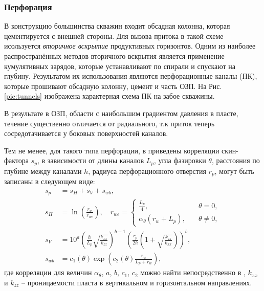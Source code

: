 \subsubsection{Перфорация}
	В конструкцию большинства скважин входит обсадная колонна, которая цементируется с внешней стороны.  Для вызова притока в такой схеме исользуется \textit{вторичное вскрытие} продуктивных горизонтов. Одним из наиболее распространённых методов вторичного вскрытия является применение кумулятивных зарядов, которые устанавливают по спирали и спускают на глубину.
Результатом их использования являются перфорационные каналы (ПК), которые прошивают обсадную колонну, цемент и часть ОЗП. На Рис. \ref{pic:tunnels} изображена характерная схема ПК на забое скважины.

	В результате в ОЗП, области с наибольшим градиентом давления в пласте, течение существенно отличается от радиального, т.к приток теперь сосредотачивается у боковых поверхностей каналов.

	Тем не менее, для такого типа перфорации, в \cite{tariq} приведены корреляции скин-фактора $s_p$, в зависимости от длины каналов $L_p$, угла фазировки $\theta$, расстояния по глубине между каналами $h$, радиуса перфорационного отверстия $r_p$, могут быть записаны в следующем виде:
\begin{align}
	\label{tunnels_skin}
	s_p &= s_H + s_V + s_{wb}, \\
	s_H &= \ln\left(\frac{r_w}{r_{we}}\right), \quad r_{we} = 
	\begin{cases}
		\frac{L_p}{4}, &\quad \theta = 0,\\
		\alpha_{\theta}(r_w + L_p), &\quad \theta \neq 0,
	\end{cases}\nonumber\\
	s_V &= 10^a\left(\frac{h}{L_p}\sqrt{\frac{k_{xx}}{k_{zz}}}\right)^{b-1}\left(\frac{r_p}{2h}\left(1+\sqrt{\frac{k_{zz}}{k_{xx}}}\right)\right)^b,\nonumber\\
	s_{wb} &= c_1(\theta)\exp\left(c_2(\theta)\frac{r_w}{L_p+r_w}\right),\nonumber
\end{align}
	где корреляции для величин $\alpha_{\theta}$, $a$, $b$, $c_1$, $c_2$ можно найти непосредственно в \cite{tariq}, $k_{xx}$ и $k_{zz}$ -- проницаемости пласта в вертикальном и горизонтальном направлениях.

